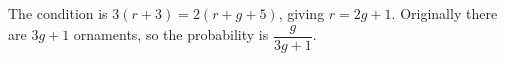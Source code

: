 The condition is $3(r+3)=2(r+g+5)$, giving $r=2g+1$. Originally there are $3g+1$ ornaments, so the probability is $\boxed{\dfrac{g}{3g+1}}$.
